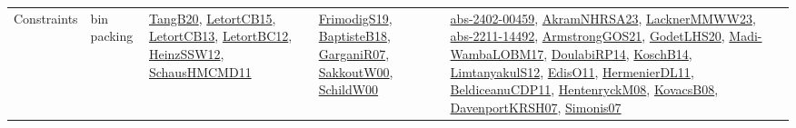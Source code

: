 {\begin{longtable}{lp{3cm}>{\raggedright}p{6cm}>{\raggedright}p{6cm}p{8cm}}
Constraints & bin packing & \href{papers/TangB20.pdf}{TangB20}\cite{TangB20}, \href{articles/LetortCB15.pdf}{LetortCB15}\cite{LetortCB15}, \href{papers/LetortCB13.pdf}{LetortCB13}\cite{LetortCB13}, \href{papers/LetortBC12.pdf}{LetortBC12}\cite{LetortBC12}, \href{articles/HeinzSSW12.pdf}{HeinzSSW12}\cite{HeinzSSW12}, \href{articles/SchausHMCMD11.pdf}{SchausHMCMD11}\cite{SchausHMCMD11} & \href{papers/FrimodigS19.pdf}{FrimodigS19}\cite{FrimodigS19}, \href{articles/BaptisteB18.pdf}{BaptisteB18}\cite{BaptisteB18}, \href{papers/GarganiR07.pdf}{GarganiR07}\cite{GarganiR07}, \href{articles/SakkoutW00.pdf}{SakkoutW00}\cite{SakkoutW00}, \href{articles/SchildW00.pdf}{SchildW00}\cite{SchildW00} & \href{articles/abs-2402-00459.pdf}{abs-2402-00459}\cite{abs-2402-00459}, \href{articles/AkramNHRSA23.pdf}{AkramNHRSA23}\cite{AkramNHRSA23}, \href{articles/LacknerMMWW23.pdf}{LacknerMMWW23}\cite{LacknerMMWW23}, \href{articles/abs-2211-14492.pdf}{abs-2211-14492}\cite{abs-2211-14492}, \href{papers/ArmstrongGOS21.pdf}{ArmstrongGOS21}\cite{ArmstrongGOS21}, \href{papers/GodetLHS20.pdf}{GodetLHS20}\cite{GodetLHS20}, \href{papers/Madi-WambaLOBM17.pdf}{Madi-WambaLOBM17}\cite{Madi-WambaLOBM17}, \href{papers/DoulabiRP14.pdf}{DoulabiRP14}\cite{DoulabiRP14}, \href{papers/KoschB14.pdf}{KoschB14}\cite{KoschB14}, \href{articles/LimtanyakulS12.pdf}{LimtanyakulS12}\cite{LimtanyakulS12}, \href{papers/EdisO11.pdf}{EdisO11}\cite{EdisO11}, \href{papers/HermenierDL11.pdf}{HermenierDL11}\cite{HermenierDL11}, \href{articles/BeldiceanuCDP11.pdf}{BeldiceanuCDP11}\cite{BeldiceanuCDP11}, \href{papers/HentenryckM08.pdf}{HentenryckM08}\cite{HentenryckM08}, \href{articles/KovacsB08.pdf}{KovacsB08}\cite{KovacsB08}, \href{papers/DavenportKRSH07.pdf}{DavenportKRSH07}\cite{DavenportKRSH07}, \href{articles/Simonis07.pdf}{Simonis07}\cite{Simonis07}\\

\end{longtable}}
